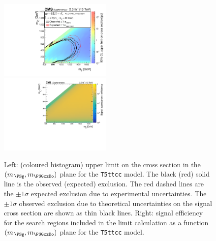 \clearpage
\begin{figure}[!h]
  \begin{center}
    \includegraphics[width=0.49\textwidth]{Supplementary/RA1T5ttccXSEC_aux} \, 
    \includegraphics[width=0.49\textwidth]{Supplementary/T5ttcc_merging_4_cats_aux} \,     
  \end{center}
  \caption{Left: (coloured histogram) upper limit on the cross section in the $(m_{\,\PSg}, m_{\PSGczDo})$ plane for the \texttt{T5ttcc} model. 
  The black (red) solid line is the observed (expected) exclusion. The red dashed lines are the $\pm1\sigma$ expected exclusion due to experimental uncertainties. 
  The $\pm1\sigma$ observed exclusion due to theoretical uncertainties on the signal cross section are shown as thin black lines. 
  Right: signal efficiency for the search regions included in the limit calculation as a function $(m_{\,\PSg}, m_{\PSGczDo})$ plane for the \texttt{T5ttcc} model. 
  \label{fig:T5ttcc_excl}}
\end{figure}


